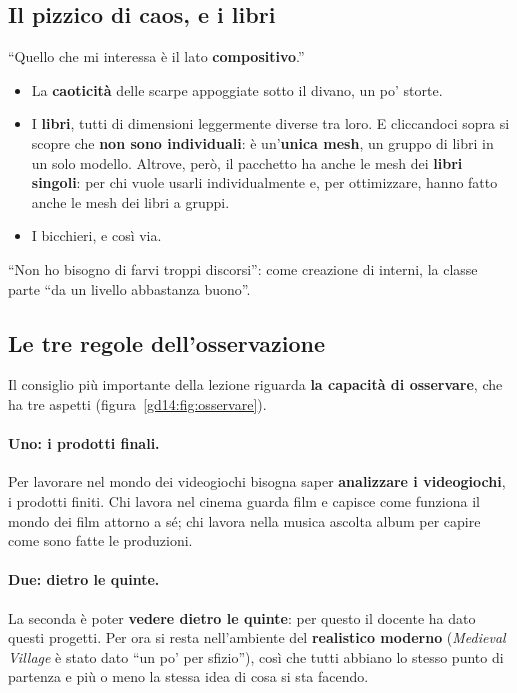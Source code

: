 \subsection{Il pizzico di caos, e i libri}

``Quello che mi interessa è il lato \textbf{compositivo}.''
\begin{itemize}
  \item La \textbf{caoticità} delle scarpe appoggiate sotto il divano, un po'
        storte.
  \item I \textbf{libri}, tutti di dimensioni leggermente diverse tra loro. E
        cliccandoci sopra si scopre che \textbf{non sono individuali}: è
        un'\textbf{unica mesh}, un gruppo di libri in un solo modello. Altrove,
        però, il pacchetto ha anche le mesh dei \textbf{libri singoli}: per chi
        vuole usarli individualmente e, per ottimizzare, hanno fatto anche le
        mesh dei libri a gruppi.
  \item I bicchieri, e così via.
\end{itemize}
``Non ho bisogno di farvi troppi discorsi'': come creazione di interni, la classe
parte ``da un livello abbastanza buono''.

\subsection{Le tre regole dell'osservazione}

Il consiglio più importante della lezione riguarda \textbf{la capacità di
osservare}, che ha tre aspetti (figura~\ref{gd14:fig:osservare}).

\paragraph{Uno: i prodotti finali.} Per lavorare nel mondo dei videogiochi bisogna
saper \textbf{analizzare i videogiochi}, i prodotti finiti. Chi lavora nel cinema
guarda film e capisce come funziona il mondo dei film attorno a sé; chi lavora
nella musica ascolta album per capire come sono fatte le produzioni.

\paragraph{Due: dietro le quinte.} La seconda è poter \textbf{vedere dietro le
quinte}: per questo il docente ha dato questi progetti. Per ora si resta
nell'ambiente del \textbf{realistico moderno} (\emph{Medieval Village} è stato dato
``un po' per sfizio''), così che tutti abbiano lo stesso punto di partenza e più o
meno la stessa idea di cosa si sta facendo.

